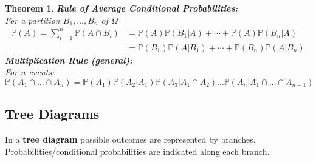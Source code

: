 \documentclass[12pt]{article}
\newcommand{\bbP}{\mathbb{P}}
\renewcommand{\_}[1]{\underline{ #1 }}
\newtheorem{theorem}{Theorem}[section]
\theoremstyle{definition}
\numberwithin{equation}{subsection}
\begin{document}
\begin{theorem}
	\textbf{Rule of Average Conditional Probabilities:}\\
 		For a partition $B_1,\dots, B_n$ of $\Omega$ 
		\begin{align*}
			\bbP(A)= \sum_{i=1}^n \bbP(A\cap B_i)
				&=\bbP(A)\bbP(B_1|A)+\cdots +\bbP(A)\bbP(B_n|A) \\
				&=\bbP(B_1)\bbP(A|B_1)+\cdots +\bbP(B_n)\bbP(A|B_n)
		\end{align*}
		\textbf{Multiplication Rule (general):}\\
		For $n$ events: \[\bbP(A_1\cap\dots \cap A_n)=\bbP(A_1)\bbP(A_2|A_1)\bbP(A_3|A_1\cap A_2)\dots\bbP(A_n|A_1\cap\dots\cap A_{n-1})\]
\end{theorem}

\subsection{Tree Diagrams}
In a \textbf{tree diagram} possible outcomes are represented by branches. Probabilities/conditional probabilities are indicated along each branch.
\end{document}
